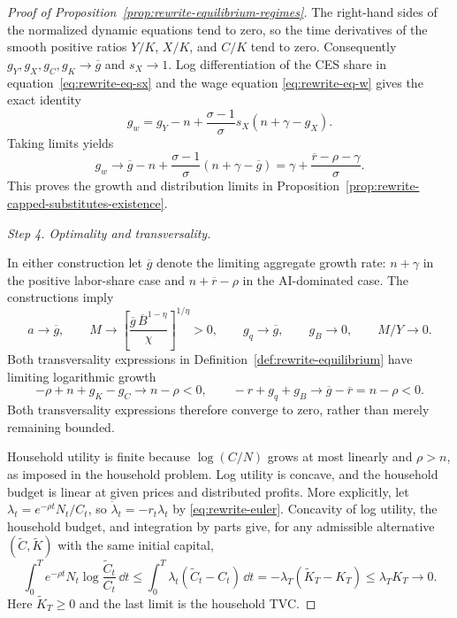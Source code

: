 \begin{proof}[Proof of Proposition~\ref{prop:rewrite-equilibrium-regimes}]
The right-hand sides of the normalized dynamic equations tend to zero,
so the time derivatives of the
smooth positive ratios $Y/K$, $X/K$, and $C/K$ tend to zero.
Consequently $g_Y,g_X,g_C,g_K\to\overline g$ and $s_X\to1$.
Log differentiation of the CES share in
equation~\eqref{eq:rewrite-eq-sx} and the wage equation
\eqref{eq:rewrite-eq-w} gives the exact identity
\[
 g_w=g_Y-n+\frac{\sigma-1}{\sigma}s_X(n+\gamma-g_X).
\]
Taking limits yields
\[
 g_w\to\overline g-n+\frac{\sigma-1}{\sigma}(n+\gamma-\overline g)
 =\gamma+\frac{\overline r-\rho-\gamma}{\sigma}.
\]
This proves the growth and distribution limits in
Proposition~\ref{prop:rewrite-capped-substitutes-existence}.

\par\medskip\noindent\textit{Step 4. Optimality and transversality.}

In either construction let $\overline g$ denote the limiting aggregate
growth rate: $n+\gamma$ in the positive labor-share case and
$n+\overline r-\rho$ in the AI-dominated case. The constructions imply
\[
 a\to\overline g,\qquad
 M\to\left[\frac{\overline g\,\overline B^{1-\eta}}{\chi}\right]^{1/\eta}>0,
 \qquad g_q\to\overline g,\qquad g_B\to0,\qquad M/Y\to0.
\]
Both transversality expressions in Definition~\ref{def:rewrite-equilibrium}
have limiting logarithmic growth
\begin{equation}
 -\rho+n+g_K-g_C\to n-\rho<0,\qquad
 -r+g_q+g_B\to\overline g-\overline r=n-\rho<0.
 \label{eq:rewrite-finite-existence-tvcs}
\end{equation}
Both transversality expressions therefore converge to zero, rather than
merely remaining bounded.

Household utility is finite because $\log(C/N)$ grows at most linearly and
$\rho>n$, as imposed in the household problem. Log utility is concave, and the
household budget is linear at given prices and distributed profits. More explicitly,
let $\lambda_t=e^{-\rho t}N_t/C_t$, so $\dot\lambda_t=-r_t\lambda_t$ by
\eqref{eq:rewrite-euler}. Concavity of log utility, the household budget,
and integration by parts give, for any admissible alternative
$(\widetilde C,\widetilde K)$ with the same initial capital,
\[
 \int_0^T e^{-\rho t}N_t
 \log\frac{\widetilde C_t}{C_t}\,\dd t
 \leq\int_0^T\lambda_t(\widetilde C_t-C_t)\,\dd t
 =-\lambda_T(\widetilde K_T-K_T)\leq\lambda_TK_T\to0.
\]
Here $\widetilde K_T\geq0$ and the last limit is the household TVC.


\end{proof}
